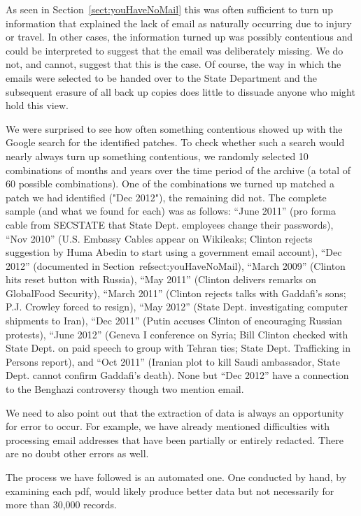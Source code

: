 \documentclass[journal]{vgtc}                %
\begin{document}
As seen in Section~\ref{sect:youHaveNoMail} this was often sufficient to turn up information that explained the lack of email as naturally occurring due to injury or travel.  In other cases, the information turned up was possibly contentious and could be interpreted to suggest that the email was deliberately missing.  We do not, and cannot, suggest that this is the case.  Of course, the way in which the emails were selected to be handed over to the State Department and the subsequent erasure of all back up copies does little to dissuade anyone who might hold this view.

We were surprised to see how often something contentious showed up with the Google search for the identified patches.   To check whether such a search would nearly always turn up something contentious, we randomly selected 10 combinations of months and years over the time period of the archive (a total of 60 possible combinations).  One of the combinations we turned up matched a patch we had identified ("Dec 2012"), the remaining did not.  The complete sample (and what we found for each) was as follows:  ``June 2011''  (pro forma cable from SECSTATE that State Dept. employees change their passwords), ``Nov 2010''  (U.S. Embassy Cables appear on Wikileaks; Clinton rejects suggestion by Huma Abedin to start using  a government email account),   ``Dec 2012'' (documented in Section~ref{sect:youHaveNoMail}), ``March 2009'' (Clinton hits reset button with Russia), ``May 2011'' (Clinton delivers remarks on GlobalFood Security), ``March 2011'' (Clinton rejects talks with Gaddafi's sons; P.J. Crowley forced to resign), ``May 2012'' (State Dept. investigating computer shipments to Iran), ``Dec 2011'' (Putin accuses Clinton of encouraging Russian protests), ``June 2012'' (Geneva I conference on Syria; Bill Clinton checked with State Dept. on paid speech to group with Tehran ties; State Dept. Trafficking in Persons report), and  ``Oct 2011'' (Iranian plot to kill Saudi ambassador, State Dept. cannot confirm Gaddafi's death).   None but ``Dec 2012'' have a connection to the Benghazi controversy though two mention email.
 
 We need to also point out that the extraction of data is always an opportunity for error to occur.   For example, we have already mentioned difficulties with processing email addresses that have been partially or entirely redacted.  There are no doubt other errors as well.  
 
 The process we have followed is an automated one.  One conducted by hand, by examining each pdf, would likely produce better data but not necessarily for more than 30,000 records.  
 
\end{document}
